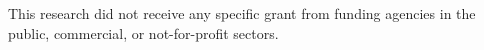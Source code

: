 \documentclass[preprint,letterpaper]{elsarticle}
\begin{document}
This research did not receive any specific grant from funding agencies in the public, commercial, or not-for-profit sectors.





%
%


%
\end{document}
